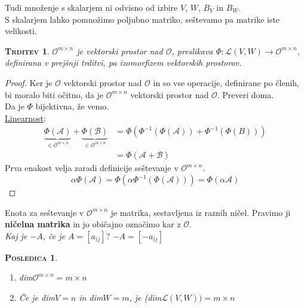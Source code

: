 \documentclass[a4paper,12pt]{article}
\newtheorem*{trditev}{\textsc{Trditev}}
\newtheorem*{posledica}{\textsc{Posledica}}
\begin{document}
Tudi množenje s skalarjem ni odvisno od izbire $V$, $W$, $B_V$ in $B_W$. \\

S skalarjem lahko pomnožimo poljubno matriko, seštevamo pa matrike iste velikosti. \\

\begin{trditev}
	$\mathcal{O}^{m\times n}$ je vektorski prostor nad $\mathcal{O}$, preslikava $\Phi: \mathcal{L}(V,W)\to \mathcal{O}^{m\times n}$, definirana v prejšnji trditvi, pa izomorfizem vektorskih prostorov.\\
\end{trditev}

\begin{proof}
	Ker je $\mathcal{O}$ vektorski prostor nad $\mathcal{O}$ in so vse operacije, definirane po členih, bi moralo biti očitno, da je $\mathcal{O}^{m\times n}$ vektorski prostor nad $\mathcal{O}$. Preveri doma.\\
	
	Da je $\Phi$ bijektivna, že vemo. \\

	\underline{Linearnost}: 
	\begin{align*}
		\underbrace{\Phi(\mathcal{A})}_{\in \mathcal{O}^{m\times n}}+\underbrace{\Phi(\mathcal{B})}_{\in \mathcal{O}^{m\times n}}&=\Phi(\Phi^{-1}(\Phi(\mathcal{A}))+\Phi^{-1}(\Phi(B)))\\
		&=\Phi(\mathcal{A}+\mathcal{B})
	\end{align*}
	Prva enakost velja zaradi definicije seštevanje v $\mathcal{O}^{m\times n}$. \\

	\begin{equation*}
		\alpha \Phi(\mathcal{A}) = \Phi(\alpha \Phi^{-1}(\Phi(\mathcal{A})))=\Phi(\alpha \mathcal{A})
	\end{equation*}
\end{proof}

Enota za seštevanje v $\mathcal{O}^{m\times n}$ je matrika, sestavljena iz raznih ničel. Pravimo ji \textbf{ničelna matrika} in jo običajno označimo kar z $\mathcal{O}$.\\

\textit{Kaj je $-A$, če je $A=[a_{ij}]?$} $-A=[-a_{ij}]$ \\

\begin{posledica} ~ 
	\begin{enumerate}
		\item dim$\mathcal{O}^{m\times n}=m\times n$
		\item Če je dim$V=n$ in dim$W=m$, je (dim$\mathcal{L}(V,W))=m\times n$ \\
	\end{enumerate}
\end{posledica}
\end{document}
